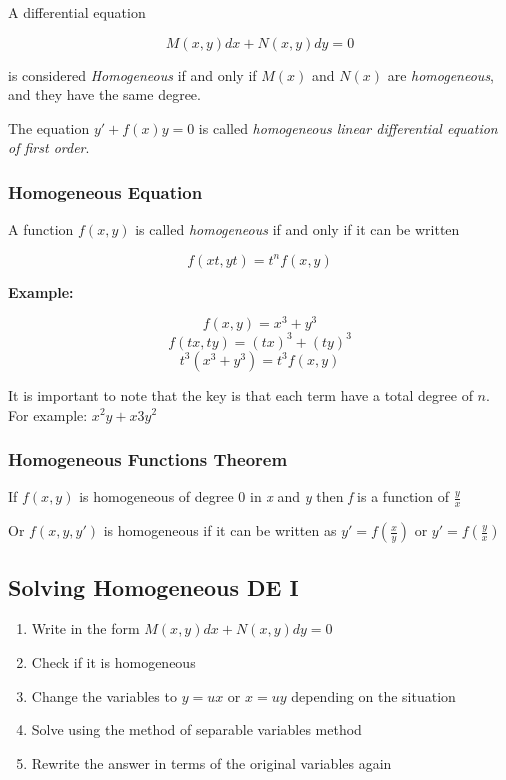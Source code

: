 A differential equation 

\[
    M(x,y)dx + N(x,y)dy = 0
\]

is considered \emph{Homogeneous} if and only if
\(M(x)\) and \(N(x)\) are \emph{homogeneous}, and they have the same degree.
\vspace{\baselineskip}

The equation \(y' + f(x)y = 0\) is called \emph{homogeneous linear differential equation of first order}.

\subsubsection{Homogeneous Equation}

A function \(f(x,y)\) is called \emph{homogeneous} if and only if it can be written

\[
    f(xt, yt) = t^n f(x,y)
\]

\textbf{Example: }

\[
    f(x,y) = x^3 + y^3
\]
\[
    f(tx, ty) = {(tx)}^3 + {(ty)}^3
\]
\[
    t^3 (x^3 + y^3) = t^3 f(x,y)
\]

It is important to note that the key is that each term have a total degree of \(n\).
For example: \(x^2y + x3y^2\)

\subsubsection{Homogeneous Functions Theorem}

If \(f(x,y)\) is homogeneous of degree \(0\) in \emph{x} and \emph{y} then 
\emph{f} is a function of \(\frac{y}{x}\)

Or \(f(x,y,y')\) is homogeneous if it can be written as \(y' = f(\frac{x}{y})\) or \(y' = f(\frac{y}{x})\)

\subsection{Solving Homogeneous DE I}

\begin{enumerate}
    \item Write in the form \(M(x,y)dx + N(x,y)dy = 0\)
    \item Check if it is homogeneous
    \item Change the variables to \(y = ux\) or \(x = uy\) depending on the situation
    \item Solve using the method of separable variables method
    \item Rewrite the answer in terms of the original variables again
\end{enumerate}

